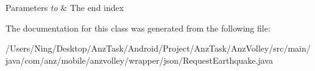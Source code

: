 \begin{DoxyParams}{Parameters}
{\em to} & The end index \\
\hline
\end{DoxyParams}


The documentation for this class was generated from the following file\+:\begin{DoxyCompactItemize}
\item 
/\+Users/\+Ning/\+Desktop/\+Anz\+Task/\+Android/\+Project/\+Anz\+Task/\+Anz\+Volley/src/main/java/com/anz/mobile/anzvolley/wrapper/json/Request\+Earthquake.\+java\end{DoxyCompactItemize}
